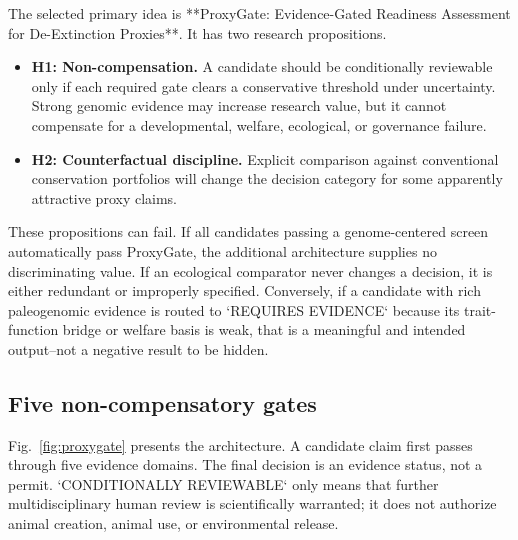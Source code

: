 \documentclass[conference]{IEEEtran}
\begin{document}
The selected primary idea is **ProxyGate: Evidence-Gated Readiness Assessment for De-Extinction Proxies**. It has two research propositions.

\begin{itemize}[leftmargin=*,nosep]
\item \textbf{H1: Non-compensation.} A candidate should be conditionally reviewable only if each required gate clears a conservative threshold under uncertainty. Strong genomic evidence may increase research value, but it cannot compensate for a developmental, welfare, ecological, or governance failure.
\item \textbf{H2: Counterfactual discipline.} Explicit comparison against conventional conservation portfolios will change the decision category for some apparently attractive proxy claims.
\end{itemize}

These propositions can fail. If all candidates passing a genome-centered screen automatically pass ProxyGate, the additional architecture supplies no discriminating value. If an ecological comparator never changes a decision, it is either redundant or improperly specified. Conversely, if a candidate with rich paleogenomic evidence is routed to `REQUIRES EVIDENCE` because its trait-function bridge or welfare basis is weak, that is a meaningful and intended output--not a negative result to be hidden.

\subsection{Five non-compensatory gates}

Fig.~\ref{fig:proxygate} presents the architecture. A candidate claim first passes through five evidence domains. The final decision is an evidence status, not a permit. `CONDITIONALLY REVIEWABLE` only means that further multidisciplinary human review is scientifically warranted; it does not authorize animal creation, animal use, or environmental release.
\end{document}
